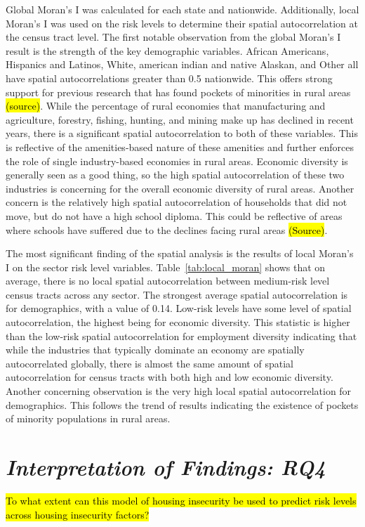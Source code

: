 Global Moran's I was calculated for each state and nationwide. Additionally, local Moran's I was used on the risk levels to determine their spatial autocorrelation at the census tract level. The first notable observation from the global Moran's I result is the strength of the key demographic variables. African Americans, Hispanics and Latinos, White, american indian and native Alaskan, and Other all have spatial autocorrelations greater than 0.5 nationwide. This offers strong support for previous research that has found pockets of minorities in rural areas \hl{(source)}.  While the percentage of rural economies that manufacturing and agriculture, forestry, fishing, hunting, and mining make up has declined in recent years, there is a significant spatial autocorrelation to both of these variables. This is reflective of the amenities-based nature of these amenities and further enforces the role of single industry-based economies in rural areas. Economic diversity is generally seen as a good thing, so the high spatial autocorrelation of these two industries is concerning for the overall economic diversity of rural areas. Another concern is the relatively high spatial autocorrelation of households that did not move, but do not have a high school diploma. This could be reflective of areas where schools have suffered due to the declines facing rural areas \hl{(Source)}. 

The most significant finding of the spatial analysis is the results of local Moran's I on the sector risk level variables. Table~\ref{tab:local_moran} shows that on average, there is no local spatial autocorrelation between medium-risk level census tracts across any sector. The strongest average spatial autocorrelation is for demographics, with a value of 0.14. Low-risk levels have some level of spatial autocorrelation, the highest being for economic diversity. This statistic is higher than the low-risk spatial autocorrelation for employment diversity indicating that while the industries that typically dominate an economy are spatially autocorrelated globally, there is almost the same amount of spatial autocorrelation for census tracts with both high and low economic diversity. Another concerning observation is the very high local spatial autocorrelation for demographics. This follows the trend of results indicating the existence of pockets of minority populations in rural areas. 



\section{\textit{Interpretation of Findings: RQ4}}
\hl{To what extent can this model of housing insecurity be used to predict risk levels across housing insecurity factors?}

